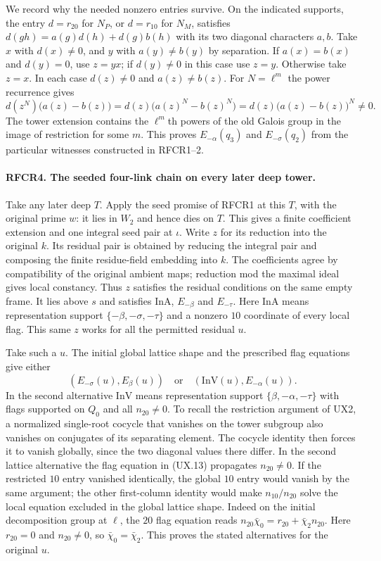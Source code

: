 We record why the needed nonzero entries survive. On the indicated
supports, the entry $d=r_{20}$ for $N_P$, or $d=r_{10}$ for $N_M$,
satisfies
$d(gh)=a(g)d(h)+d(g)b(h)$ with its two diagonal characters $a,b$.
Take $x$ with $d(x)\ne0$, and $y$ with $a(y)\ne b(y)$ by separation.
If $a(x)=b(x)$ and $d(y)=0$, use $z=yx$; if $d(y)\ne0$ in this
case use $z=y$. Otherwise take $z=x$. In each case $d(z)\ne0$ and
$a(z)\ne b(z)$. For $N=\ell^m$ the power recurrence gives
\[
 d(z^N)\bigl(a(z)-b(z)\bigr)
       =d(z)\bigl(a(z)^N-b(z)^N\bigr)
       =d(z)\bigl(a(z)-b(z)\bigr)^N\ne0 .
\]
The tower extension contains the $\ell^m$th powers of the old Galois
group in the image of restriction for some $m$. This proves
$E_{-\alpha}(q_3)$ and $E_{-\sigma}(q_2)$ from the particular witnesses
constructed in RFCR1--2.

\paragraph{RFCR4. The seeded four-link chain on every later deep tower.}
Take any later deep $T$. Apply the seed promise of RFCR1 at this $T$,
with the original prime $w$: it lies in $W_2$ and hence dies on $T$.
This gives a finite coefficient extension and one integral seed pair
at $\iota$. Write $z$ for its reduction into the original $k$. Its
residual pair is obtained by reducing the integral pair and composing
the finite residue-field embedding into $k$. The coefficients agree
by compatibility of the original ambient maps; reduction mod the
maximal ideal gives local constancy. Thus $z$ satisfies the residual
conditions on the same empty frame. It lies above $s$ and satisfies
$\mathrm{InA}$, $E_{-\beta}$ and $E_{-\tau}$. Here
$\mathrm{InA}$ means representation support
$\{-\beta,-\sigma,-\tau\}$ and a nonzero $10$ coordinate of every
local flag. This same $z$ works for all the permitted residual $u$.

Take such a $u$. The initial global lattice shape and the prescribed
flag equations give either
\[
 (E_{-\sigma}(u),E_\beta(u))\quad\text{or}\quad
 (\mathrm{InV}(u), E_{-\alpha}(u)).
\]
In the second alternative $\mathrm{InV}$ means representation support
$\{\beta,-\alpha,-\tau\}$ with flags supported on $Q_0$ and all
$n_{20}\ne0$. To recall the restriction argument of UX2, a normalized
single-root cocycle that vanishes on the tower subgroup also vanishes
on conjugates of its separating element. The cocycle identity then
forces it to vanish globally, since the two diagonal values there
differ. In the second lattice alternative the flag equation in (UX.13)
propagates $n_{20}\ne0$. If the restricted $10$ entry vanished
identically, the global $10$ entry would vanish by the same argument;
the other first-column identity would make $n_{10}/n_{20}$ solve the
local equation excluded in the global lattice shape. Indeed on the initial
decomposition group at $\ell$, the $20$ flag equation reads
$n_{20}\bar\chi_0=r_{20}+\bar\chi_2 n_{20}$. Here $r_{20}=0$
and $n_{20}\ne0$, so $\bar\chi_0=\bar\chi_2$. This proves the
stated alternatives for the original $u$.


